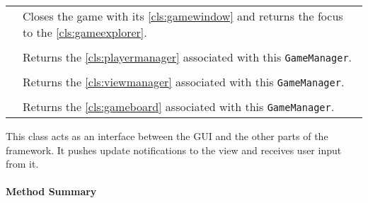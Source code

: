 \begin{longtable}{Lp{10cm}}
	& Closes the game with its \ref{cls:gamewindow} and returns the focus to the \ref{cls:gameexplorer}. \\
	 \\
	& Returns the \ref{cls:playermanager} associated with this \texttt{GameManager}.\\
	 \\
	& Returns the \ref{cls:viewmanager} associated with this \texttt{GameManager}.\\
	 \\
	& Returns the \ref{cls:gameboard} associated with this \texttt{GameManager}.\\
	\hline
\end{longtable}

\pagebreak

This class acts as an interface between the \gls{GUI} and the other parts of the \gls{framework}. It pushes update notifications to the view and receives user input from it. \\

\centerdash

\paragraph*{Method Summary}
